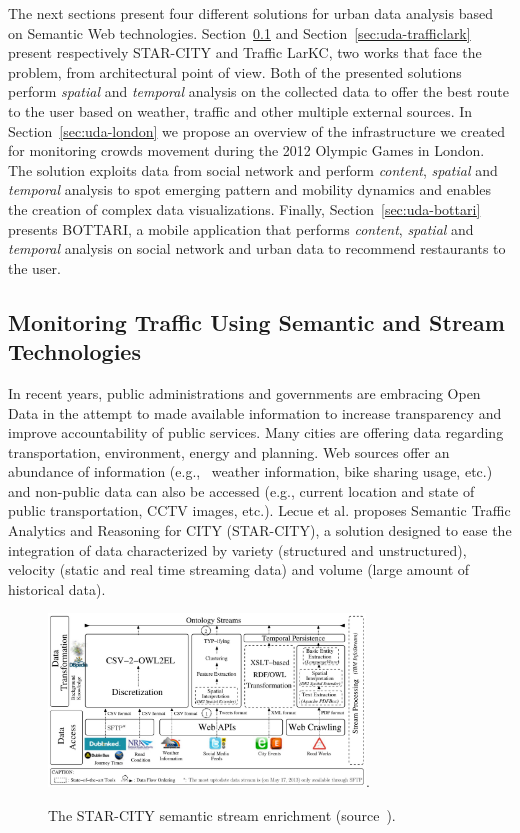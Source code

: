 The next sections present four different solutions for urban data analysis based on Semantic Web technologies.
Section~\ref{sec:uda-starcity} and Section~\ref{sec:uda-trafficlark} present respectively STAR-CITY and Traffic LarKC, two works that face the problem, from architectural point of view. Both of the presented solutions perform \textit{spatial} and \textit{temporal} analysis on the collected data to offer the best route to the user based on weather, traffic and other multiple external sources.
In Section~\ref{sec:uda-london} we propose an overview of the infrastructure we created for monitoring crowds movement during the 2012 Olympic Games in London. The solution exploits data from social network and perform \textit{content}, \textit{spatial} and \textit{temporal} analysis to spot emerging pattern and mobility dynamics and enables the creation of complex data visualizations.
Finally, Section~\ref{sec:uda-bottari} presents BOTTARI, a mobile application that performs \textit{content}, \textit{spatial} and \textit{temporal} analysis on social network and urban data to recommend restaurants to the user.

\subsection{Monitoring Traffic Using Semantic and Stream Technologies} \label{sec:uda-starcity}
In recent years, public administrations and governments are embracing Open Data in the attempt to made available information to increase transparency and improve accountability of public services. Many cities are offering data regarding transportation, environment, energy and planning. Web sources offer an abundance of information (e.g., ~weather information, bike sharing usage, etc.) and non-public data can also be accessed (e.g., current location and state of public transportation, CCTV images, etc.).
Lecue et al.\cite{DBLP:journals/ws/LecueTHTBST14} proposes Semantic Traffic Analytics and Reasoning for CITY (STAR-CITY), a solution designed to ease the integration of data characterized by variety (structured and unstructured), velocity (static and real time streaming data) and volume (large amount of historical data).

\begin{figure}[t]
	\centering
	\includegraphics[width=0.75\textwidth]{img/starcity}.
    \caption{The STAR-CITY semantic stream enrichment (source~\cite{DBLP:journals/ws/LecueTHTBST14}).}
    \label{fig:star-city}
\end{figure}

